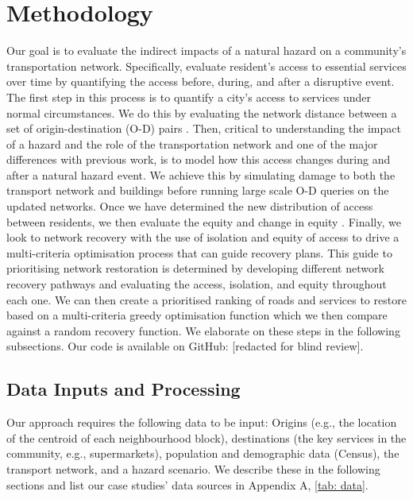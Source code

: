 \documentclass[review,3p,times,onecolumn,sort&compress,12pt]{elsarticle}
\let \cite \parencite
\begin{document}

\section{Methodology}
Our goal is to evaluate the indirect impacts of a natural hazard on a community's transportation network.
Specifically, evaluate resident's access to essential services over time by quantifying the access before, during, and after a disruptive event.
The first step in this process is to quantify a city’s access to services under normal circumstances.
We do this by evaluating the network distance between a set of origin-destination (O-D) pairs \cite{logan2019evaluating,Logan2021-ineq}. 
Then, critical to understanding the impact of a hazard and the role of the transportation network and one of the major differences with previous work, is to model how this access changes during and after a natural hazard event.
We achieve this by simulating damage to both the transport network and buildings before running large scale O-D queries on the updated networks. 
Once we have determined the new distribution of access between residents, we then evaluate the equity and change in equity \cite{sheriff2020health, Logan2021-ineq}.
Finally, we look to network recovery with the use of isolation and equity of access to drive a multi-criteria optimisation process that can guide recovery plans. 
This guide to prioritising network restoration is determined by developing different network recovery pathways and evaluating the access, isolation, and equity throughout each one.
We can then create a prioritised ranking of roads and services to restore based on a multi-criteria greedy optimisation function which we then compare against a random recovery function. 
We elaborate on these steps in the following subsections.
Our code is available on GitHub: [redacted for blind review].

\subsection{Data Inputs and Processing}
Our approach requires the following data to be input: Origins (e.g., the location of the centroid of each neighbourhood block), destinations (the key services in the community, e.g., supermarkets), population and demographic data (Census), the transport network, and a hazard scenario.
We describe these in the following sections and list our case studies' data sources in Appendix A, \autoref{tab: data}.
\end{document}
